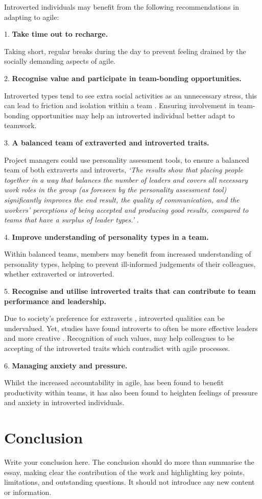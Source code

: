 \documentclass{scrartcl}
\begin{document}
Introverted individuals may benefit from the following recommendations in adapting to agile:

1. \textbf{Take time out to recharge.}

Taking short, regular breaks during the day to prevent feeling drained by the socially demanding aspects of agile.

2. \textbf{Recognise value and participate in team-bonding opportunities.}
 
Introverted types tend to see extra social activities as an unnecessary stress, this can lead to friction and isolation within a team \cite{WhitworthBiddle}. Ensuring involvement in team-bonding opportunities may help an introverted individual better adapt to teamwork.

3. \textbf{A balanced team of extraverted and introverted traits.}

Project managers could use personality assessment tools, to ensure a balanced team of both extraverts and introverts, \textit{`The results show that placing people together in a way that balances the number of leaders and covers all necessary work roles in the group (as foreseen by the personality assessment tool) significantly improves the end result, the quality of communication, and the workers’ perceptions of being accepted and producing good results, compared to teams that have a surplus of leader types.'} \cite{Lykourentzou}. 

4. \textbf{Improve understanding of personality types in a team.}

Within balanced teams, members may benefit from increased understanding of personality types, helping to prevent ill-informed judgements of their colleagues, whether extraverted or introverted. 

5. \textbf{Recognise and utilise introverted traits that can contribute to team performance and leadership.}

Due to society's preference for extraverts \cite{Cain}, introverted qualities can be undervalued. Yet, studies have found introverts to often be more effective leaders \cite{Morrish} and more creative \cite{feist}. Recognition of such values, may help colleagues to be accepting of the introverted traits which contradict with agile processes.

6. \textbf{Managing anxiety and pressure.}

Whilst the increased accountability in agile, has been found to benefit productivity within teams, it has also been found to heighten feelings of pressure and anxiety in introverted individuals. 

\section{Conclusion}

Write your conclusion here. The conclusion should do more than summarise the essay, making clear the contribution of the work and highlighting key points, limitations, and outstanding questions. It should not introduce any new content or information.




\end{document}
